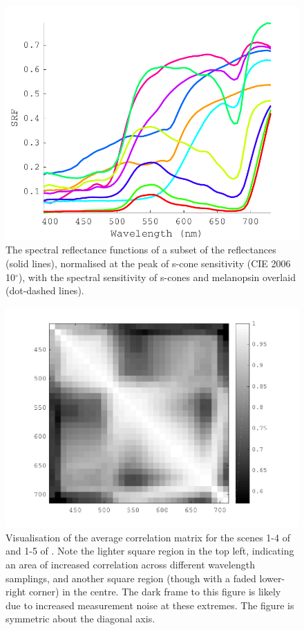 \begin{figure}[htbp] %
 \includegraphics[max width=\textwidth]{figs/comp/plateau.pdf}
 \caption{The spectral reflectance functions of a subset of the \citet{vrhel_measurement_1994} reflectances (solid lines), normalised at the peak of s-cone sensitivity (CIE 2006 10$^{\circ}$), with the spectral sensitivity of s-cones and melanopsin \citep{lucas_measuring_2014} overlaid (dot-dashed lines).}
 \label{fig:plateau}
\end{figure} 

\begin{figure}[htbp]
 \includegraphics[max width=\textwidth]{figs/comp/nat_cor/foster.pdf}
 \caption{Visualisation of the average correlation matrix for the scenes 1-4 of \citet{nascimento_statistics_2002} and 1-5 of \citet{foster_frequency_2006}. Note the lighter square region in the top left, indicating an area of increased correlation across different wavelength samplings, and another square region (though with a faded lower-right corner) in the centre. The dark frame to this figure is likely due to increased measurement noise at these extremes. The figure is symmetric about the diagonal axis.}
 \label{fig:foster}
\end{figure} %

